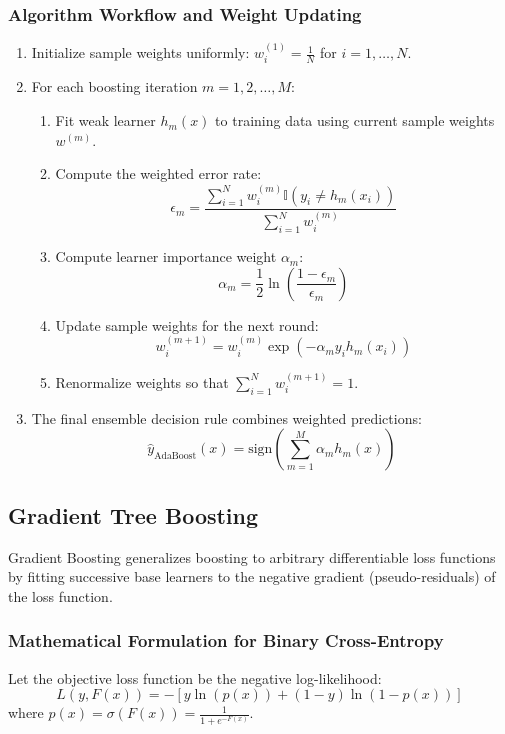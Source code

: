 \documentclass[12pt,a4paper]{article}
\begin{document}
\subsubsection*{Algorithm Workflow and Weight Updating}
\begin{enumerate}
\item Initialize sample weights uniformly: $w_i^{(1)} = \frac{1}{N}$ for $i = 1, \dots, N$.
\item For each boosting iteration $m = 1, 2, \dots, M$:
\begin{enumerate}
\item Fit weak learner $h_m(x)$ to training data using current sample weights $w^{(m)}$.
\item Compute the weighted error rate:
\begin{equation}
\epsilon_m = \frac{\sum_{i=1}^{N} w_i^{(m)} \mathbb{I}(y_i \neq h_m(x_i))}{\sum_{i=1}^{N} w_i^{(m)}}
\end{equation}
\item Compute learner importance weight $\alpha_m$:
\begin{equation}
\alpha_m = \frac{1}{2} \ln \left( \frac{1 - \epsilon_m}{\epsilon_m} \right)
\end{equation}
\item Update sample weights for the next round:
\begin{equation}
w_i^{(m+1)} = w_i^{(m)} \exp \left( - \alpha_m y_i h_m(x_i) \right)
\end{equation}
\item Renormalize weights so that $\sum_{i=1}^{N} w_i^{(m+1)} = 1$.
\end{enumerate}
\item The final ensemble decision rule combines weighted predictions:
\begin{equation}
\hat{y}_{\text{AdaBoost}}(x) = \text{sign} \left( \sum_{m=1}^{M} \alpha_m h_m(x) \right)
\end{equation}
\end{enumerate}

\subsection{Gradient Tree Boosting}

Gradient Boosting generalizes boosting to arbitrary differentiable loss functions by fitting successive base learners to the negative gradient (pseudo-residuals) of the loss function.

\subsubsection*{Mathematical Formulation for Binary Cross-Entropy}
Let the objective loss function be the negative log-likelihood:
\begin{equation}
L(y, F(x)) = - \left[ y \ln(p(x)) + (1 - y) \ln(1 - p(x)) \right]
\end{equation}
where $p(x) = \sigma(F(x)) = \frac{1}{1 + e^{-F(x)}}$.
\end{document}
